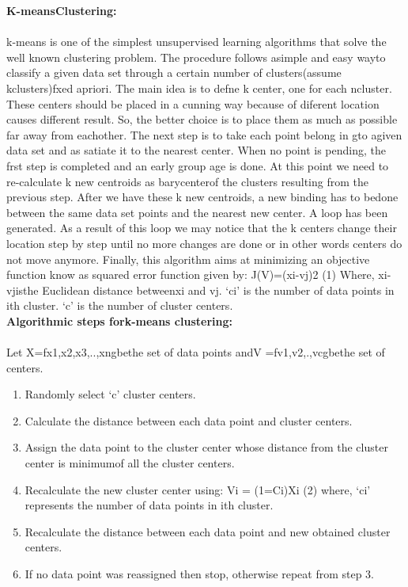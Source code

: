 \documentclass[11pt]{article}
\begin{document}
	\textbf{K-meansClustering:} \\
	\paragraph{}
	k-means is one of the simplest unsupervised learning algorithms that
	solve the well known clustering problem. The procedure follows asimple and easy wayto
	classify a given data set through a certain number of clusters(assume kclusters)fxed apriori. The
	main idea is to defne k center, one for each ncluster. These centers should be placed in a cunning
	way because of diferent location causes different result. So, the better choice is to place them as
	much as possible far away from eachother. The next step is to take each point belong in gto
	agiven data set and as satiate it to the nearest center. When no point is pending, the frst step is
	completed and an early group age is done. At this point we need to re-calculate k new centroids
	as barycenterof the clusters resulting from the previous step. After we have these k new
	centroids, a new binding has to bedone between the same data set points and the nearest new
	center. A loop has been generated. As a result of this loop we may notice that the k centers
	change their location step by step until no more changes are done or in other words centers do
	not move anymore. Finally, this algorithm aims at minimizing
	an objective function know as squared error function given by:
	J(V)=(xi-vj)2 (1)
	Where,
	xi-vjisthe Euclidean distance betweenxi and vj.
	`ci’ is the number of data points in ith cluster.
	`c’ is the number of cluster centers. \\
	
	\textbf{Algorithmic steps fork-means clustering:} \\
	\paragraph{}
	
	Let X=fx1,x2,x3,..,xngbethe set of data points andV =fv1,v2,.,vcgbethe
	set of centers.
	\begin{enumerate}
		\item Randomly select `c’ cluster centers.
		\item Calculate the distance between each data point and cluster centers.
		\item Assign the data point to the cluster center whose distance from the cluster center is
		minimumof all the cluster centers.
		\item Recalculate the new cluster center using: Vi = (1=Ci)Xi (2)
		where, `ci’ represents the number of data points in ith cluster.
		\item Recalculate the distance between each data point and new obtained cluster centers.
		\item If no data point was reassigned then stop, otherwise repeat from step 3.
		
	\end{enumerate}
	
\end{document}
